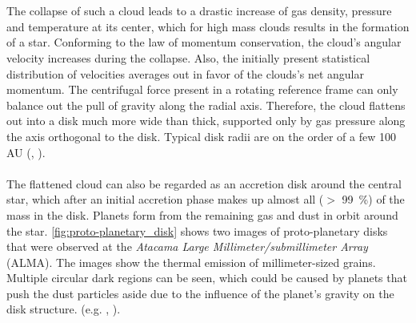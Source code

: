     \\
    \\
    The collapse of such a cloud leads to a drastic increase of gas density, 
    pressure and temperature at its center, which for high mass clouds results 
    in the formation of a star. 
    Conforming to the law of momentum 
    conservation, the cloud's angular velocity increases during the collapse.
    Also, the initially present statistical distribution of velocities averages 
    out in favor of the clouds's net angular momentum.
    The centrifugal force present in a rotating reference frame can only 
    balance out the pull of gravity along the radial axis. Therefore, the cloud
    flattens out into a disk much more wide than thick, supported
    only by gas pressure along the axis orthogonal to the disk. 
    Typical disk radii are on the order of a few 100 AU 
    (\citeauthor{Pfalzner_2015}, \citeyear{Pfalzner_2015}).
    \\
    \\
    The flattened cloud can also be regarded as an accretion disk around the 
    central star, which after an initial accretion phase 
    makes up almost all ($>$ \SI{99}{\percent}) of the mass in the disk. 
    Planets form from the remaining gas and dust in orbit around the star. 
    \autoref{fig:proto-planetary_disk} shows two images of proto-planetary disks 
    that were observed at the 
    \textit{Atacama Large Millimeter/submillimeter Array}
    (ALMA). The images show the thermal emission of millimeter-sized grains.
    Multiple circular dark regions can be seen, which could be caused by 
    planets that push the dust particles aside due to the influence of the 
    planet's gravity on the disk structure.
    (e.g. \citeauthor{Paardekooper_2006}, \citeyear{Paardekooper_2006}).
